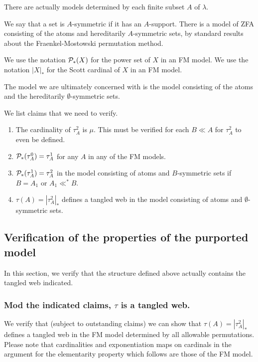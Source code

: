 \documentclass[12pt]{article}
\begin{document}
There are actually models determined by each finite subset $A$ of $\lambda$.

We say that a set is $A$-symmetric if it has an $A$-support.   There is a model of ZFA consisting of the atoms and hereditarily $A$-symmetric sets, by standard results about the
Fraenkel-Mostowski permutation method.

We use the notation ${\cal P}_*(X)$ for the power set of $X$ in an FM model.  We use the notation $|X|_*$ for the Scott cardinal of $X$ in an FM model.

The model we are ultimately concerned with is the model consisting of the atoms and the hereditarily $\emptyset$-symmetric sets.

We list claims that we need to verify.

\begin{enumerate}

\item The cardinality of $\tau^2_A$ is $\mu$.  This must be verified for each $B \ll A$ for $\tau^2_A$ to even be defined.

\item ${\cal P}_*(\tau^0_A) = \tau^1_A$  for any $A$ in any of the FM models.

\item ${\cal P}_*(\tau^1_A) = \tau^2_A$ in the model consisting of atoms and $B$-symmetric sets if $B=A_1$ or $A_1 \ll^* B$. 

\item $\tau(A) = |\tau^2_A|_*$ defines a tangled web in the model consisting of atoms and $\emptyset$-symmetric sets.

\end{enumerate}

\newpage

\subsection{Verification of the properties of the purported model}

In this section, we verify that the structure defined above actually contains the tangled web indicated.

\newpage

\subsubsection{Mod the indicated claims, $\tau$ is a tangled web.}

We verify that (subject to outstanding claims) we can show that $\tau(A) = |\tau^2_A|_*$ defines a tangled web in the FM model determined by all allowable permutations.  Please note that cardinalities and exponentiation maps on cardinals in the argument for the elementarity property which  follows are those of the FM model.
\end{document}
